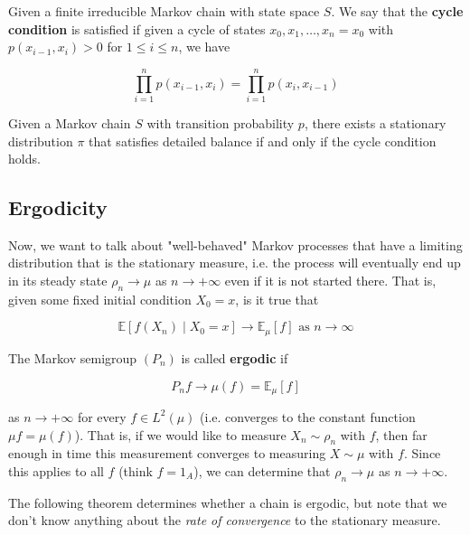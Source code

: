 \documentclass{article}
\begin{document}
      \begin{definition}
        Given a finite irreducible Markov chain with state space $S$. We say that the \textbf{cycle condition} is satisfied if given a cycle of states $x_0, x_1, \ldots, x_n = x_0$ with $p(x_{i-1}, x_i) > 0$ for $1 \leq i \leq n$, we have 

          \[\prod_{i=1}^n p(x_{i-1}, x_i) = \prod_{i=1}^n p(x_i, x_{i-1})\]
      \end{definition}

      \begin{theorem}
        Given a Markov chain $S$ with transition probability $p$, there exists a stationary distribution $\pi$ that satisfies detailed balance if and only if the cycle condition holds. 
      \end{theorem}

  \subsection{Ergodicity}

    Now, we want to talk about "well-behaved" Markov processes that have a limiting distribution that is the stationary measure, i.e. the process will eventually end up in its steady state $\rho_n \rightarrow \mu$ as $n \rightarrow +\infty$ even if it is not started there. That is, given some fixed initial condition $X_0 = x$, is it true that 

      \[\mathbb{E}[f(X_n) \mid X_0 = x] \rightarrow \mathbb{E}_\mu [f] \text{ as } n \rightarrow \infty\]

    \begin{definition}[Ergodicity]
      The Markov semigroup $(P_n)$ is called \textbf{ergodic} if 

        \[P_n f \rightarrow \mu(f) = \mathbb{E}_\mu [f]\]

      as $n \rightarrow +\infty$ for every $f \in L^2 (\mu)$ (i.e. converges to the constant function $\mu f = \mu(f)$). That is, if we would like to measure $X_n \sim \rho_n$ with $f$, then far enough in time this measurement converges to measuring $X \sim \mu$ with $f$. Since this applies to all $f$ (think $f = 1_A$), we can determine that $\rho_n \rightarrow \mu$ as $n \rightarrow +\infty$. 
    \end{definition}

    The following theorem determines whether a chain is ergodic, but note that we don't know anything about the \textit{rate of convergence} to the stationary measure. 
\end{document}
